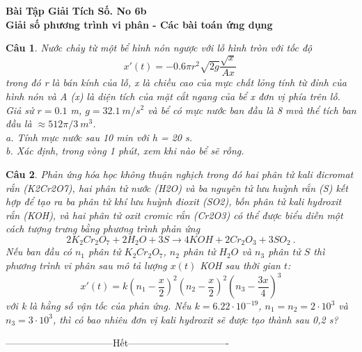 \documentclass[11pt]{article}
\newtheorem{bt}{Câu}
\begin{document}


\begin{center}
	{\bf Bài Tập Giải Tích Số. No 6b \\ Giải số phương trình vi phân - Các bài toán ứng dụng}
\end{center}


\begin{bt}
Nước chảy từ một bể hình nón ngược với lỗ hình tròn với tốc độ
%
\[
x'(t) = - 0.6 \pi r^2 \sqrt{2g} \dfrac{\sqrt{x}}{Ax} \,
\]
%
trong đó r là bán kính của lỗ, x là chiều cao của mực chất lỏng tính từ đỉnh của hình nón và A (x) là diện tích của mặt cắt ngang của bể x đơn vị phía trên lỗ. Giả sử $ r = 0.1 $ m, $ g = 32.1 \ m/ s ^ 2 $ và bể có mực nước ban đầu là 8 mvà thể tích ban đầu là $ \approx 512 \pi / 3 \ m^ 3 $. \\
a. Tính mực nước sau 10 min với h = 20 s. \\
b. Xác định, trong vòng 1 phút, xem khi nào bể sẽ rỗng.
\end{bt}

\begin{bt}
Phản ứng hóa học không thuận nghịch trong đó hai phân tử kali đicromat rắn (K2Cr2O7), hai phân tử nước (H2O) và ba nguyên tử lưu huỳnh rắn (S) kết hợp để tạo ra ba phân tử khí lưu huỳnh đioxit (SO2), bốn phân tử kali hydroxit rắn (KOH), và hai phân tử oxit cromic rắn (Cr2O3) có thể được biểu diễn một cách tượng trưng bằng phương trình phản ứng
%
\begin{equation}
2K_2Cr_2O_7 + 2H_2O + 3S \rightarrow 4KOH + 2Cr_2O_3 + 3SO_2 \ .
\end{equation}
%
Nếu ban đầu có $ n_1 $ phân tử $ K_2Cr_2O_7 $, $ n_2 $ phân tử $ H_2O $ và $ n_3 $ phân tử $ S $ thì phương trình vi phân sau mô tả lượng $x(t)$ KOH sau thời gian $t$:
%
\[
x'(t) = k \left( n_1 - \dfrac{x}{2} \right)^2 \left( n_2 - \dfrac{x}{2} \right)^2  \left( n_3 - \dfrac{3x}{4} \right)^3 
\]
%
với k là hằng số vận tốc của phản ứng. Nếu $ k = 6.22 \cdot 10^{- 19} $, $ n_1 = n_2 = 2 \cdot 10^3 $ và $ n_3 = 3 \cdot 10 ^ 3 $, thì có bao nhiêu đơn vị kali hydroxit sẽ được tạo thành sau 0,2 s?
\end{bt}

\centerline{———————————Hết——————————-}
\end{document}
